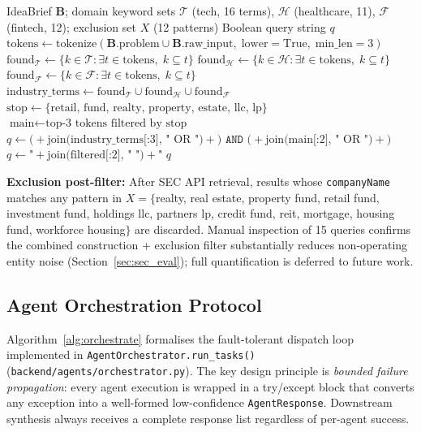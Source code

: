 \documentclass[preprint,12pt]{elsarticle}
\newcommand{\B}{\mathbf{B}}
\newcommand{\calT}{\mathcal{T}}
\newcommand{\calH}{\mathcal{H}}
\newcommand{\calF}{\mathcal{F}}
\begin{document}
\begin{algorithm}[t]
\caption{Domain-Adaptive SEC Query Constructor}
\label{alg:sec}
\begin{algorithmic}[1]
\Require IdeaBrief $\B$; domain keyword sets $\calT$ (tech, 16 terms),
         $\calH$ (healthcare, 11), $\calF$ (fintech, 12);
         exclusion set $X$ (12 patterns)
\Ensure Boolean query string $q$
\State $\text{tokens} \leftarrow \text{tokenize}(\B.\text{problem} \cup \B.\text{raw\_input},\;\text{lower}=\text{True},\;\text{min\_len}=3)$
\State $\text{found}_\calT \leftarrow \{k \in \calT : \exists t \in \text{tokens},\; k \subseteq t\}$
\State $\text{found}_\calH \leftarrow \{k \in \calH : \exists t \in \text{tokens},\; k \subseteq t\}$
\State $\text{found}_\calF \leftarrow \{k \in \calF : \exists t \in \text{tokens},\; k \subseteq t\}$
\State $\text{industry\_terms} \leftarrow \text{found}_\calT \cup \text{found}_\calH \cup \text{found}_\calF$
  \State $\text{stop} \leftarrow \{\text{retail, fund, realty, property, estate, llc, lp}\}$
  \State $\text{main} \leftarrow \text{top-3 tokens filtered by stop}$
  \State $q \leftarrow \texttt{(} + \text{join(industry\_terms[:3], " OR ")} + \texttt{) AND (} + \text{join(main[:2], " OR ")} + \texttt{)}$
\Else
  \State $q \leftarrow \texttt{"} + \text{join(filtered[:2], " ")} + \texttt{"}$
\EndIf
\State \Return $q$
\end{algorithmic}
\end{algorithm}

\textbf{Exclusion post-filter:} After SEC API retrieval, results whose
\texttt{companyName} matches any pattern in $X = \{$realty, real estate, property
fund, retail fund, investment fund, holdings llc, partners lp, credit fund, reit,
mortgage, housing fund, workforce housing$\}$ are discarded. Manual inspection of
15 queries confirms the combined construction + exclusion filter substantially
reduces non-operating entity noise (Section~\ref{sec:sec_eval}); full
quantification is deferred to future work.

\subsection{Agent Orchestration Protocol}
\label{sec:orchestration}

Algorithm~\ref{alg:orchestrate} formalises the fault-tolerant dispatch loop
implemented in \texttt{AgentOrchestrator.run\_tasks()}
(\texttt{backend/agents/orchestrator.py}). The key design principle is
\emph{bounded failure propagation}: every agent execution is wrapped in a
try/except block that converts any exception into a well-formed low-confidence
\texttt{AgentResponse}. Downstream synthesis always receives a complete
response list regardless of per-agent success.
\end{document}
